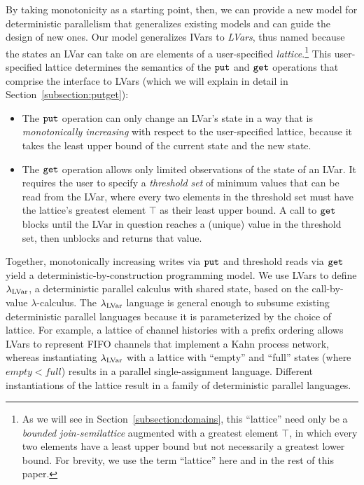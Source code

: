 By taking monotonicity as a starting point, then, we can provide a
new model for deterministic parallelism that
generalizes existing models and can guide the design of new ones.  Our
model generalizes IVars to \emph{LVars}, thus named because the states
an LVar can take on are elements of a user-specified
{\em lattice}.\footnote{
As we will see in Section~\ref{subsection:domains}, this ``lattice'' need only be a 
{\em bounded join-semilattice} augmented with a greatest element $\top$, in which every two elements have a least upper
bound but not necessarily a greatest lower bound.  For brevity, we use the term
  ``lattice'' here and in the
  rest of this paper.}
This user-specified lattice
determines the semantics of the $\mbox{\texttt{put}}$ and
$\mbox{\texttt{get}}$ operations that comprise the interface to LVars (which we 
will explain in detail in Section~\ref{subsection:putget}):
\begin{itemize}
\item The $\mbox{\texttt{put}}$ operation can only change an LVar's state in a way
  that is {\em monotonically increasing} with respect to the user-specified
  lattice, because it takes the least upper bound of the current
  state and the new state.

\item The $\mbox{\texttt{get}}$ operation allows only limited observations of the
  state of an LVar.  It requires the user to specify a {\em threshold
    set} of minimum values that can be read from the LVar, where every
  two elements in the threshold set must have the lattice's
  greatest element $\top$ as their least upper bound.  A call to
  $\mbox{\texttt{get}}$ blocks until the LVar in question reaches a (unique) value in the threshold set,
  then unblocks and returns that value.
\end{itemize}
Together, monotonically increasing writes via $\mbox{\texttt{put}}$ and threshold reads 
via $\mbox{\texttt{get}}$
yield a deterministic-by-construction programming model.
We use LVars to define $\lambda_{\textrm{LVar}}$, a deterministic parallel calculus
with shared state, based on the call-by-value $\lambda$-calculus.  The
$\lambda_{\textrm{LVar}}$ language is general enough to subsume existing
deterministic parallel languages because it is parameterized by the
choice of lattice.  For example, a lattice of channel histories with a
prefix ordering allows LVars to represent FIFO channels that implement
a Kahn process network, whereas instantiating $\lambda_{\textrm{LVar}}$ with a
lattice with ``empty'' and ``full'' states (where $\mathit{empty} <
\mathit{full}$) results in a parallel single-assignment language.
Different instantiations of the lattice result in a family of
deterministic parallel languages.

